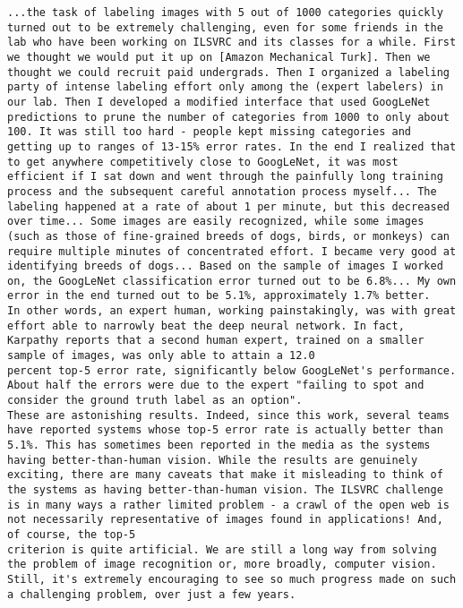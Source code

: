 \begin{lstlisting}
...the task of labeling images with 5 out of 1000 categories quickly turned out to be extremely challenging, even for some friends in the lab who have been working on ILSVRC and its classes for a while. First we thought we would put it up on [Amazon Mechanical Turk]. Then we thought we could recruit paid undergrads. Then I organized a labeling party of intense labeling effort only among the (expert labelers) in our lab. Then I developed a modified interface that used GoogLeNet predictions to prune the number of categories from 1000 to only about 100. It was still too hard - people kept missing categories and getting up to ranges of 13-15% error rates. In the end I realized that to get anywhere competitively close to GoogLeNet, it was most efficient if I sat down and went through the painfully long training process and the subsequent careful annotation process myself... The labeling happened at a rate of about 1 per minute, but this decreased over time... Some images are easily recognized, while some images (such as those of fine-grained breeds of dogs, birds, or monkeys) can require multiple minutes of concentrated effort. I became very good at identifying breeds of dogs... Based on the sample of images I worked on, the GoogLeNet classification error turned out to be 6.8%... My own error in the end turned out to be 5.1%, approximately 1.7% better. 
In other words, an expert human, working painstakingly, was with great effort able to narrowly beat the deep neural network. In fact, Karpathy reports that a second human expert, trained on a smaller sample of images, was only able to attain a 12.0
percent top-5 error rate, significantly below GoogLeNet's performance. About half the errors were due to the expert "failing to spot and consider the ground truth label as an option".
These are astonishing results. Indeed, since this work, several teams have reported systems whose top-5 error rate is actually better than 5.1%. This has sometimes been reported in the media as the systems having better-than-human vision. While the results are genuinely exciting, there are many caveats that make it misleading to think of the systems as having better-than-human vision. The ILSVRC challenge is in many ways a rather limited problem - a crawl of the open web is not necessarily representative of images found in applications! And, of course, the top-5
criterion is quite artificial. We are still a long way from solving the problem of image recognition or, more broadly, computer vision. Still, it's extremely encouraging to see so much progress made on such a challenging problem, over just a few years.

\end{lstlisting}
